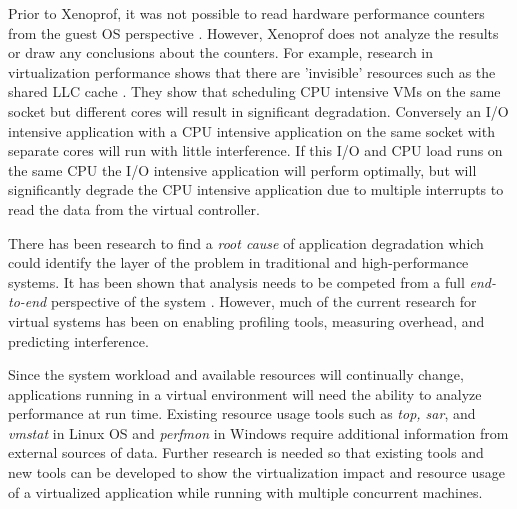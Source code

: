 \indent Prior to Xenoprof, it was not possible to read hardware performance counters from the guest OS perspective \cite{menon, du2}.  However, Xenoprof does not analyze the results or draw any conclusions about the counters.  For example, research in virtualization performance shows that there are 'invisible' resources such as the shared LLC cache \cite{tickoo}.  They show that scheduling CPU intensive VMs on the same socket but different cores will result in significant degradation.  Conversely an I/O intensive application with a CPU intensive application on the same socket with separate cores will run with little interference.  If this I/O and CPU load runs on the same CPU the I/O intensive application will perform optimally, but will significantly degrade the CPU intensive application due to multiple interrupts to read the data from the virtual controller.

\indent There has been research to find a \emph{root cause} of application degradation which could identify the layer of the problem in traditional \cite{traeger} and high-performance \cite{knapp1} systems.  It has been shown that analysis needs to be competed from a full \emph{end-to-end} perspective of the system \cite{saltzer, gupta1}.  However, much of the current research for virtual systems has been on enabling profiling tools, measuring overhead, and predicting interference.  

\indent Since the system workload and available resources will continually change, applications running in a virtual environment will need the ability to analyze performance at run time.  
Existing resource usage tools such as \emph{top, sar}, and \emph{vmstat} in Linux OS and \emph{perfmon} in Windows require additional information from external sources of data.  
Further research is needed so that existing tools and new tools can be developed to show the virtualization impact and resource usage of a virtualized application while running with multiple concurrent machines.
